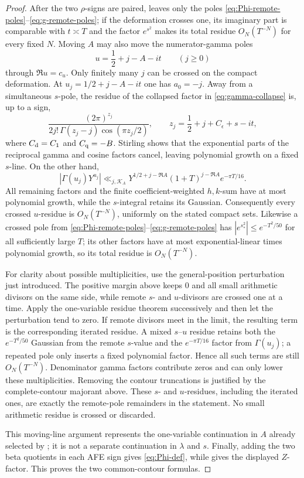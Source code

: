 \begin{proof}
After the two $\rho$-signs are paired,
 leaves only the poles
\eqref{eq:Phi-remote-poles}--\eqref{eq:g-remote-poles}; if the deformation
crosses one, its imaginary part is comparable with $t\asymp T$ and the
factor $e^{s^2}$ makes its total residue $O_N(T^{-N})$ for every fixed $N$.
Moving $A$ may also move the numerator-gamma poles
\begin{equation}\label{eq:remote-u-poles}
 u=\frac12+j-A-it\qquad(j\geq0)
\end{equation}
through $\Re u=c_u$.  Only finitely many $j$ can be crossed on the compact
deformation.  At $u_j=1/2+j-A-it$ one has $a_0=-j$.  Away from a simultaneous
$s$-pole, the residue of the collapsed factor in
\eqref{eq:gamma-collapse} is, up to a sign,
\[
 \frac{(2\pi)^{z_j}}
 {2j!\,\Gamma(z_j-j)\cos(\pi z_j/2)},
 \qquad z_j=\frac12+j+C_\epsilon+s-it,
\]
where $C_{\rm d}=C_1$ and $C_{\rm q}=-B$.  Stirling shows that the exponential
parts of the reciprocal gamma and cosine factors cancel, leaving polynomial
growth on a fixed $s$-line.  On the other hand,
\[
 |\Gamma(u_j)Y^{u_j}|
 \ll_{j,\mathscr K_A}
 Y^{1/2+j-\Re A}(1+T)^{j-\Re A}e^{-\pi T/16}.
\]
All remaining factors and the finite coefficient-weighted $h,k$-sum have at
most polynomial growth, while the $s$-integral retains its Gaussian.
Consequently every crossed $u$-residue is $O_N(T^{-N})$, uniformly on the
stated compact sets.  Likewise a crossed pole from
\eqref{eq:Phi-remote-poles}--\eqref{eq:g-remote-poles} has
$|e^{s_*^2}|\leq e^{-T^2/50}$ for all sufficiently large $T$; its other
factors have at most exponential-linear
times polynomial growth, so its total residue is $O_N(T^{-N})$.

For clarity about possible multiplicities, use the general-position
perturbation just introduced.  The positive margin above keeps $0$ and all
small arithmetic divisors on the same side, while remote $s$- and
$u$-divisors are crossed one at a time.  Apply the one-variable residue
theorem successively and then let the perturbation tend to zero.  If remote
divisors meet in the limit, the resulting term is the corresponding iterated
residue.  A mixed $s$--$u$ residue retains both the $e^{-T^2/50}$ Gaussian
from the remote $s$-value and the $e^{-\pi T/16}$ factor from
$\Gamma(u_j)$; a repeated pole only inserts a
fixed polynomial factor.  Hence all such terms are still $O_N(T^{-N})$.
Denominator gamma factors contribute zeros and can only lower these
multiplicities.  Removing the contour truncations is justified by the
complete-contour majorant above.  These $s$- and $u$-residues, including the
iterated ones, are exactly the remote-pole remainders in the statement.  No
small arithmetic residue is crossed or discarded.

This moving-line argument represents the one-variable continuation in $A$
already selected by ; it is not a separate continuation in
$\lambda$ and $s$.  Finally, adding the two beta quotients in each AFE sign
gives \eqref{eq:Phi-def}, while  gives the displayed
$Z$-factor.  This proves the two common-contour formulas.
\end{proof}

